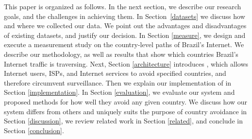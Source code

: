 This paper is organized as follows.  In the next section, we describe
our research goals, and the challenges in achieving them.  In
Section~\ref{datasets} we discuss how and where we collected our data.
We point out the advantages and disadvantages of existing datasets, and
justify our decision.  In Section \ref{measure}, we design and execute a
measurement study on the country-level paths of Brazil's Internet.  We
describe our methodology, as well as results that show which countries
Brazil's Internet traffic is traversing.  Next, Section
\ref{architecture} introduces \system{}, which allows Internet users, ISPs,
and Internet services to avoid specified countries, and therefore
circumvent surveillance.  Then we explain our implementation of \system{}
in Section \ref{implementation}.  In Section \ref{evaluation}, we
evaluate our system and proposed methods for how well they avoid any
given country.  We discuss how our system differs from others and
uniquely suits the purpose of country avoidance in Section
\ref{discussion}, we review related work in Section \ref{related}, and
conclude in Section \ref{conclusion}. 
